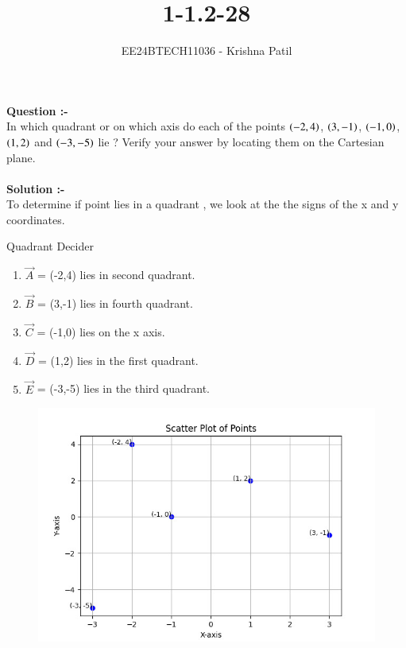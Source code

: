 \documentclass[journal]{IEEEtran}
\begin{document}

\vspace{3cm}

\title{1-1.2-28}
\author{EE24BTECH11036 - Krishna Patil}
{\let\newpage\relax\maketitle}

\renewcommand{\thefigure}{\theenumi}
\renewcommand{\thetable}{\theenumi}
\setlength{\intextsep}{10pt} %


\renewcommand{\thetable}{\theenumi}

\textbf { Question :- } \\
 In which quadrant or on which axis do each of the points {$ \left(-2,4 \right)$}, {$ \left(3,-1\right) $}, {$ \left(-1,0\right) $}, {$ \left(1,2\right) $} and {$ \left(-3,-5\right) $} lie ? Verify your answer by locating them on the Cartesian plane. \\ \\
\textbf { Solution :- } \\
To determine if point lies in a quadrant , we look at the the signs of the x and y coordinates.
\begin{table}[h!]    
  \centering
  
  \caption{Quadrant Decider}
  \label{tab1-1.2-28}
\end{table}
\begin{enumerate}
\item {$ \vec A $} = (-2,4) lies in second quadrant.
\item {$ \vec B $} = (3,-1)  lies in fourth quadrant.
\item {$ \vec C $} = (-1,0) lies on the x axis.
\item {$ \vec D $} = (1,2) lies in the first quadrant.
\item {$ \vec E $} = (-3,-5) lies in the third quadrant.
\end {enumerate} 
\begin{figure}[h!]
   \centering
   \includegraphics[width=0.6\linewidth]{figures/Scatter Plot.jpg}
   \label{x-yplot}
\end{figure}
\end{document}
